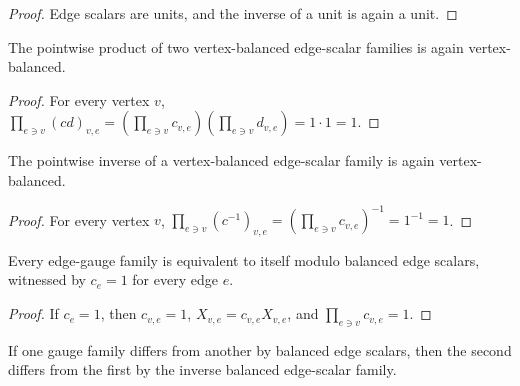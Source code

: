 \begin{proof}\leanok
    Edge scalars are units, and the inverse of a unit is again a unit.
\end{proof}

\begin{theorem}%
    \label{thm:IsVertexBalanced_mul}
    \leanok
    The pointwise product of two vertex-balanced edge-scalar families is again
    vertex-balanced.
\end{theorem}

\begin{proof}\leanok
    For every vertex $v$,
    $\prod_{e\ni v}(cd)_{v,e}=
        (\prod_{e\ni v}c_{v,e})(\prod_{e\ni v}d_{v,e})=1\cdot 1=1$.
\end{proof}

\begin{theorem}%
    \label{thm:IsVertexBalanced_inv}
    \leanok
    The pointwise inverse of a vertex-balanced edge-scalar family is again
    vertex-balanced.
\end{theorem}

\begin{proof}\leanok
    For every vertex $v$,
    $\prod_{e\ni v}(c^{-1})_{v,e}=
        (\prod_{e\ni v}c_{v,e})^{-1}=1^{-1}=1$.
\end{proof}

\begin{theorem}%
    \label{thm:GaugeEquivModEdgeScalars_refl}
    \leanok
    Every edge-gauge family is equivalent to itself modulo balanced edge
    scalars, witnessed by $c_e=1$ for every edge $e$.
    \begin{center}
        \TNPEPSEdgeGaugeOrientation
    \end{center}
\end{theorem}

\begin{proof}\leanok
    If $c_e=1$, then $c_{v,e}=1$, $X_{v,e}=c_{v,e}X_{v,e}$, and
    $\prod_{e\ni v}c_{v,e}=1$.
\end{proof}

\begin{theorem}%
    \label{thm:GaugeEquivModEdgeScalars_symm}
    \leanok
    If one gauge family differs from another by balanced edge scalars, then the
    second differs from the first by the inverse balanced edge-scalar family.
    \begin{center}
        \TNPEPSEdgeGaugeOrientation
    \end{center}
\end{theorem}

